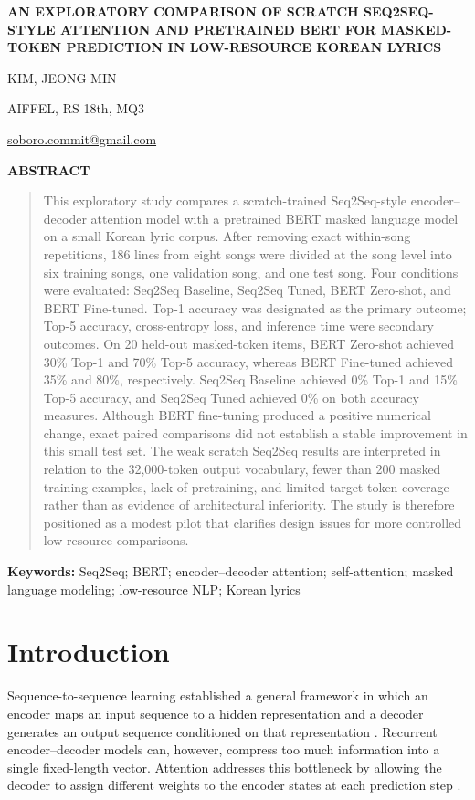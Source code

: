 \documentclass[10pt,letterpaper]{article}
\newcommand{\papertitle}{An Exploratory Comparison of Scratch Seq2Seq-Style Attention and Pretrained BERT for Masked-Token Prediction in Low-Resource Korean Lyrics}
\begin{document}
\begin{center}
{\Large\bfseries\MakeUppercase{\papertitle}\par}
\vspace{0.9em}
{\normalsize KIM, JEONG MIN\par}
{\small AIFFEL, RS 18th, MQ3\par}
{\small \href{mailto:soboro.commit@gmail.com}{soboro.commit@gmail.com}\par}
\end{center}

\vspace{0.6em}
\begin{center}\textbf{ABSTRACT}\end{center}
\begin{quote}\small
This exploratory study compares a scratch-trained Seq2Seq-style encoder--decoder attention model with a pretrained BERT masked language model on a small Korean lyric corpus. After removing exact within-song repetitions, 186 lines from eight songs were divided at the song level into six training songs, one validation song, and one test song. Four conditions were evaluated: Seq2Seq Baseline, Seq2Seq Tuned, BERT Zero-shot, and BERT Fine-tuned. Top-1 accuracy was designated as the primary outcome; Top-5 accuracy, cross-entropy loss, and inference time were secondary outcomes. On 20 held-out masked-token items, BERT Zero-shot achieved 30\% Top-1 and 70\% Top-5 accuracy, whereas BERT Fine-tuned achieved 35\% and 80\%, respectively. Seq2Seq Baseline achieved 0\% Top-1 and 15\% Top-5 accuracy, and Seq2Seq Tuned achieved 0\% on both accuracy measures. Although BERT fine-tuning produced a positive numerical change, exact paired comparisons did not establish a stable improvement in this small test set. The weak scratch Seq2Seq results are interpreted in relation to the 32,000-token output vocabulary, fewer than 200 masked training examples, lack of pretraining, and limited target-token coverage rather than as evidence of architectural inferiority. The study is therefore positioned as a modest pilot that clarifies design issues for more controlled low-resource comparisons.
\end{quote}
\noindent\textbf{Keywords:} Seq2Seq; BERT; encoder--decoder attention; self-attention; masked language modeling; low-resource NLP; Korean lyrics

\section{Introduction}
Sequence-to-sequence learning established a general framework in which an encoder maps an input sequence to a hidden representation and a decoder generates an output sequence conditioned on that representation \parencite{sutskever2014}. Recurrent encoder--decoder models can, however, compress too much information into a single fixed-length vector. Attention addresses this bottleneck by allowing the decoder to assign different weights to the encoder states at each prediction step \parencite{bahdanau2015,luong2015}.
\end{document}
